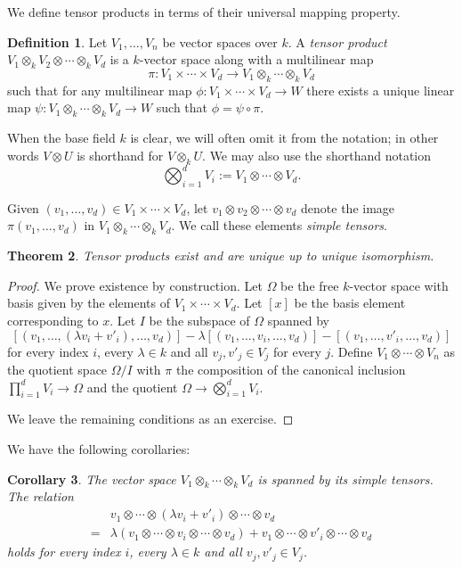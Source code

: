 \documentclass[12pt]{article}
\theoremstyle{plain}
\newtheorem{theorem}{Theorem}[section]
\newtheorem{corollary}[theorem]{Corollary}
\theoremstyle{definition}
\newtheorem{definition}[theorem]{Definition}
\theoremstyle{remark}
\numberwithin{equation}{section}
\begin{document}
We define tensor products in terms of their universal mapping property.

\begin{definition}
Let $V_1,\ldots, V_n$ be vector spaces over $k$.
A \emph{tensor product} $V_1 \otimes_k V_2 \otimes \cdots \otimes_k V_d$
is a $k$-vector space along with a multilinear map
\[
\pi : V_1 \times \cdots \times V_d
\to  V_1 \otimes_k \cdots \otimes_k V_d
\]
such that for any multilinear map $\phi : V_1 \times \cdots \times V_d
\to W$ there exists a unique linear map
$\psi : V_1 \otimes_k \cdots \otimes_k V_d \to W$ such that
$\phi = \psi \circ \pi$.
\end{definition}

When the base field $k$ is clear, we will often omit it from the
notation; in other words $V \otimes U$ is shorthand for $V \otimes_k U$.
We may also use the shorthand notation
\[
\bigotimes_{i=1}^d V_i := V_1 \otimes \cdots \otimes V_d .
\]

Given $(v_1,\ldots, v_d) \in V_1 \times \cdots \times V_d$,
let $v_1 \otimes v_2 \otimes \cdots \otimes v_d$ denote the image
$\pi(v_1,\ldots,v_d)$ in $V_1 \otimes_k \cdots \otimes_k V_d$.
We call these elements \emph{simple tensors}.

\begin{theorem}
Tensor products exist and are unique up to unique isomorphism.
\end{theorem}

\begin{proof}
We prove existence by construction.
Let $\Omega$ be the free $k$-vector space with basis given by the elements of
$V_1 \times \cdots \times V_d$.  Let $[x]$ be the basis element
corresponding to $x$.
Let $I$ be the subspace of $\Omega$ spanned by
\[
[(v_1, \ldots, (\lambda v_i + v'_i), \ldots, v_d)]
-
\lambda[(v_1, \ldots,v_i, \ldots, v_d)] -
[(v_1, \ldots, v'_i, \ldots, v_d)]
\]
for every index $i$, every $\lambda \in k$ and all $v_j,v'_j \in V_j$
for every $j$.
Define $V_1 \otimes \cdots \otimes V_n$ as the quotient space
$\Omega/I$ with $\pi$ the composition of the canonical inclusion
$\prod_{i=1}^d V_i \to \Omega$ and the quotient $\Omega \to
\bigotimes_{i=1}^d V_i$.

We leave the remaining conditions as an exercise.
\end{proof}

We have the following corollaries:

\begin{corollary}
The vector space $V_1 \otimes_k \cdots \otimes_k V_d$
is spanned by its simple tensors.
The relation
\begin{align*}
&v_1 \otimes \cdots \otimes (\lambda v_i + v'_i) \otimes \cdots \otimes
v_d\\
=&
\lambda(v_1 \otimes \cdots \otimes v_i \otimes \cdots \otimes v_d) +
v_1 \otimes \cdots \otimes v'_i \otimes \cdots \otimes v_d
\end{align*}
holds
for every index $i$, every $\lambda \in k$ and all $v_j,v'_j \in V_j$.
\end{corollary}
\end{document}
